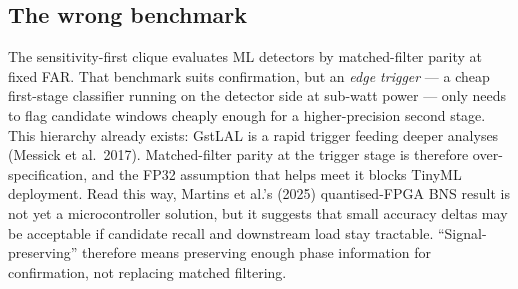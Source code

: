 \documentclass[11pt,a4paper]{article}
\begin{document}
\subsection{The wrong benchmark}
The sensitivity-first clique evaluates ML detectors by matched-filter parity at fixed FAR. That benchmark suits confirmation, but an \textit{edge trigger} — a cheap first-stage classifier running on the detector side at sub-watt power — only needs to flag candidate windows cheaply enough for a higher-precision second stage. This hierarchy already exists: GstLAL is a rapid trigger feeding deeper analyses (Messick et al.\ 2017). Matched-filter parity at the trigger stage is therefore over-specification, and the FP32 assumption that helps meet it blocks TinyML deployment. Read this way, Martins et al.'s (2025) quantised-FPGA BNS result is not yet a microcontroller solution, but it suggests that small accuracy deltas may be acceptable if candidate recall and downstream load stay tractable. ``Signal-preserving'' therefore means preserving enough phase information for confirmation, not replacing matched filtering.
\end{document}
